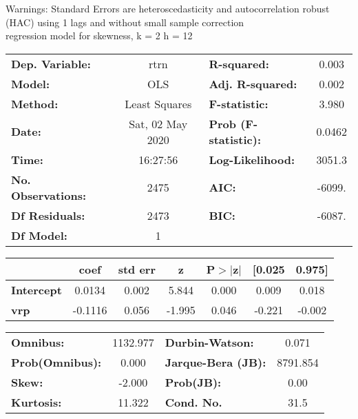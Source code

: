 Warnings: \newline
 [1] Standard Errors are heteroscedasticity and autocorrelation robust (HAC) using 1 lags and without small sample correction\\ 

regression model for skewness, k = 2 h = 12\begin{center}
\begin{tabular}{lclc}
\toprule
\textbf{Dep. Variable:}    &       rtrn       & \textbf{  R-squared:         } &     0.003   \\
\textbf{Model:}            &       OLS        & \textbf{  Adj. R-squared:    } &     0.002   \\
\textbf{Method:}           &  Least Squares   & \textbf{  F-statistic:       } &     3.980   \\
\textbf{Date:}             & Sat, 02 May 2020 & \textbf{  Prob (F-statistic):} &   0.0462    \\
\textbf{Time:}             &     16:27:56     & \textbf{  Log-Likelihood:    } &    3051.3   \\
\textbf{No. Observations:} &        2475      & \textbf{  AIC:               } &    -6099.   \\
\textbf{Df Residuals:}     &        2473      & \textbf{  BIC:               } &    -6087.   \\
\textbf{Df Model:}         &           1      & \textbf{                     } &             \\
\bottomrule
\end{tabular}
\begin{tabular}{lcccccc}
                   & \textbf{coef} & \textbf{std err} & \textbf{z} & \textbf{P$> |$z$|$} & \textbf{[0.025} & \textbf{0.975]}  \\
\midrule
\textbf{Intercept} &       0.0134  &        0.002     &     5.844  &         0.000        &        0.009    &        0.018     \\
\textbf{vrp}       &      -0.1116  &        0.056     &    -1.995  &         0.046        &       -0.221    &       -0.002     \\
\bottomrule
\end{tabular}
\begin{tabular}{lclc}
\textbf{Omnibus:}       & 1132.977 & \textbf{  Durbin-Watson:     } &    0.071  \\
\textbf{Prob(Omnibus):} &   0.000  & \textbf{  Jarque-Bera (JB):  } & 8791.854  \\
\textbf{Skew:}          &  -2.000  & \textbf{  Prob(JB):          } &     0.00  \\
\textbf{Kurtosis:}      &  11.322  & \textbf{  Cond. No.          } &     31.5  \\
\bottomrule
\end{tabular}
\end{center}

